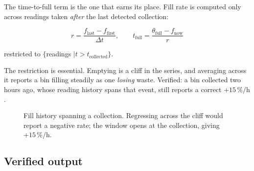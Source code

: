 \documentclass[11pt,a4paper]{article}
\begin{document}
The time-to-full term is the one that earns its place. Fill rate is
computed only across readings taken \emph{after} the last detected
collection:

\[
r = \frac{f_{\text{last}} - f_{\text{first}}}{\Delta t},
\qquad
t_{\text{full}} = \frac{\theta_{\text{full}} - f_{\text{now}}}{r}
\]

restricted to $\{$readings $\mid t > t_{\text{collected}}\}$.

The restriction is essential. Emptying is a cliff in the series, and
averaging across it reports a bin filling steadily as one \emph{losing}
waste. Verified: a bin collected two hours ago, whose reading history
spans that event, still reports a correct $+15\,\%/\text{h}$.

\begin{figure}[h]
\centering
{}
\caption{Fill history spanning a collection. Regressing across the cliff
would report a negative rate; the window opens at the collection, giving
$+15\,\%/\text{h}$.}
\end{figure}

\subsection{Verified output}
\end{document}
